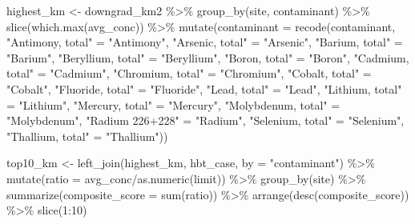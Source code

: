 \documentclass[12pt, twoside]{amherstthesis}
\newenvironment{Shaded}{\begin{snugshade}}{\end{snugshade}}
\newcommand{\AttributeTok}[1]{\textcolor[rgb]{0.77,0.63,0.00}{#1}}
\newcommand{\DecValTok}[1]{\textcolor[rgb]{0.00,0.00,0.81}{#1}}
\newcommand{\FunctionTok}[1]{\textcolor[rgb]{0.00,0.00,0.00}{#1}}
\newcommand{\NormalTok}[1]{#1}
\newcommand{\OtherTok}[1]{\textcolor[rgb]{0.56,0.35,0.01}{#1}}
\newcommand{\SpecialCharTok}[1]{\textcolor[rgb]{0.00,0.00,0.00}{#1}}
\newcommand{\StringTok}[1]{\textcolor[rgb]{0.31,0.60,0.02}{#1}}
\begin{document}
\begin{Shaded}
\begin{Highlighting}[]
\NormalTok{highest\_km }\OtherTok{\textless{}{-}}\NormalTok{ downgrad\_km2 }\SpecialCharTok{\%\textgreater{}\%}
  \FunctionTok{group\_by}\NormalTok{(site, contaminant) }\SpecialCharTok{\%\textgreater{}\%}
  \FunctionTok{slice}\NormalTok{(}\FunctionTok{which.max}\NormalTok{(avg\_conc)) }\SpecialCharTok{\%\textgreater{}\%}
  \FunctionTok{mutate}\NormalTok{(}\AttributeTok{contaminant =} \FunctionTok{recode}\NormalTok{(contaminant,}
                              \StringTok{"Antimony, total"} \OtherTok{=} \StringTok{"Antimony"}\NormalTok{,}
                              \StringTok{"Arsenic, total"} \OtherTok{=} \StringTok{"Arsenic"}\NormalTok{,}
                              \StringTok{"Barium, total"} \OtherTok{=} \StringTok{"Barium"}\NormalTok{,}
                              \StringTok{"Beryllium, total"} \OtherTok{=} \StringTok{"Beryllium"}\NormalTok{,}
                              \StringTok{"Boron, total"} \OtherTok{=} \StringTok{"Boron"}\NormalTok{,}
                              \StringTok{"Cadmium, total"} \OtherTok{=} \StringTok{"Cadmium"}\NormalTok{,}
                              \StringTok{"Chromium, total"} \OtherTok{=} \StringTok{"Chromium"}\NormalTok{,}
                              \StringTok{"Cobalt, total"} \OtherTok{=} \StringTok{"Cobalt"}\NormalTok{,}
                              \StringTok{"Fluoride, total"} \OtherTok{=} \StringTok{"Fluoride"}\NormalTok{,}
                              \StringTok{"Lead, total"} \OtherTok{=} \StringTok{"Lead"}\NormalTok{,}
                              \StringTok{"Lithium, total"} \OtherTok{=} \StringTok{"Lithium"}\NormalTok{,}
                              \StringTok{"Mercury, total"} \OtherTok{=} \StringTok{"Mercury"}\NormalTok{,}
                              \StringTok{"Molybdenum, total"} \OtherTok{=} \StringTok{"Molybdenum"}\NormalTok{,}
                              \StringTok{"Radium 226+228"} \OtherTok{=} \StringTok{"Radium"}\NormalTok{,}
                              \StringTok{"Selenium, total"} \OtherTok{=} \StringTok{"Selenium"}\NormalTok{,}
                              \StringTok{"Thallium, total"} \OtherTok{=} \StringTok{"Thallium"}\NormalTok{))}

\NormalTok{top10\_km }\OtherTok{\textless{}{-}} \FunctionTok{left\_join}\NormalTok{(highest\_km, hbt\_case, }\AttributeTok{by =} \StringTok{"contaminant"}\NormalTok{) }\SpecialCharTok{\%\textgreater{}\%}
  \FunctionTok{mutate}\NormalTok{(}\AttributeTok{ratio =}\NormalTok{ avg\_conc}\SpecialCharTok{/}\FunctionTok{as.numeric}\NormalTok{(limit)) }\SpecialCharTok{\%\textgreater{}\%}
  \FunctionTok{group\_by}\NormalTok{(site) }\SpecialCharTok{\%\textgreater{}\%}
  \FunctionTok{summarize}\NormalTok{(}\AttributeTok{composite\_score =} \FunctionTok{sum}\NormalTok{(ratio)) }\SpecialCharTok{\%\textgreater{}\%}
  \FunctionTok{arrange}\NormalTok{(}\FunctionTok{desc}\NormalTok{(composite\_score)) }\SpecialCharTok{\%\textgreater{}\%}
  \FunctionTok{slice}\NormalTok{(}\DecValTok{1}\SpecialCharTok{:}\DecValTok{10}\NormalTok{)}
\end{Highlighting}
\end{Shaded}
\end{document}
